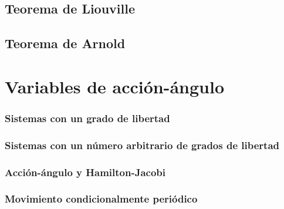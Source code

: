 \subsection{Teorema de Liouville}
\subsection{Teorema de Arnold}
\section{Variables de acción-ángulo}
\subsubsection{Sistemas con un grado de libertad}
\subsubsection{Sistemas con un número arbitrario de grados de libertad}
\subsubsection{Acción-ángulo y Hamilton-Jacobi}
\subsubsection{Movimiento condicionalmente periódico}
